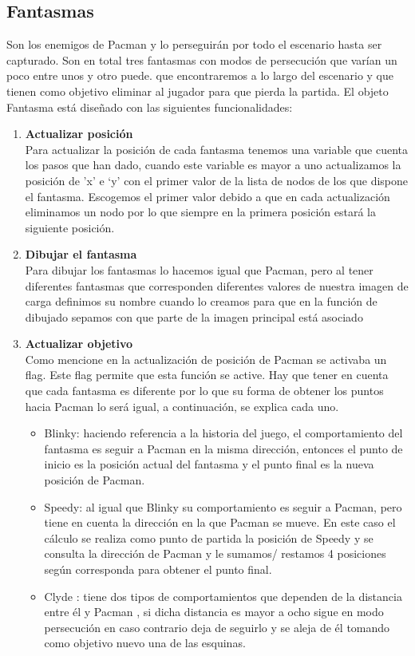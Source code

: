 \subsection{Fantasmas}
Son los enemigos de Pacman y lo perseguirán por todo el escenario hasta ser capturado. Son en total
tres fantasmas con modos de persecución que varían un poco entre unos y otro puede. que
encontraremos a lo largo del escenario y que tienen como objetivo eliminar al jugador para que
pierda la partida.
El objeto Fantasma está diseñado con las siguientes funcionalidades:
\begin{enumerate}
\item \textbf{Actualizar posición} \\Para actualizar la posición de cada fantasma tenemos una variable que cuenta los pasos que han
dado, cuando este variable es mayor a uno actualizamos la posición de ’x’ e ‘y’ con el primer valor de
la lista de nodos de los que dispone el fantasma.
Escogemos el primer valor debido a que en cada actualización eliminamos un nodo por lo que
siempre en la primera posición estará la siguiente posición.
\item \textbf{Dibujar el fantasma }\\Para dibujar los fantasmas lo hacemos igual que Pacman, pero al tener diferentes fantasmas que
corresponden diferentes valores de nuestra imagen de carga definimos su nombre cuando lo
creamos para que en la función de dibujado sepamos con que parte de la imagen principal está
asociado
\item \textbf{Actualizar objetivo}\\Como mencione en la actualización de posición de Pacman se activaba un flag. Este flag permite que
esta función se active.
Hay que tener en cuenta que cada fantasma es diferente por lo que su forma de obtener los puntos
hacia Pacman lo será igual, a continuación, se explica cada uno.
\begin{itemize}
\item  Blinky: haciendo referencia a la historia del juego, el comportamiento del fantasma es seguir
a Pacman en la misma dirección, entonces el punto de inicio es la posición actual del
fantasma y el punto final es la nueva posición de Pacman.
\item Speedy: al igual que Blinky su comportamiento es seguir a Pacman, pero tiene en cuenta la
dirección en la que Pacman se mueve. En este caso el cálculo se realiza como punto de
partida la posición de Speedy y se consulta la dirección de Pacman y le sumamos/ restamos
4 posiciones según corresponda para obtener el punto final.
\item Clyde : tiene dos tipos de comportamientos que dependen de la distancia entre él y Pacman
, si dicha distancia es mayor a ocho sigue en modo persecución en caso contrario deja de
seguirlo y se aleja de él tomando como objetivo nuevo una de las esquinas.\end{itemize}
\end{enumerate}
	
